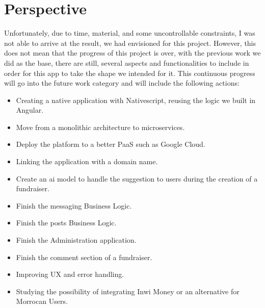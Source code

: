 \section*{Perspective}
Unfortunately, due to time, material, and some uncontrollable constraints, I was not able to arrive 
at the result, we had envisioned
for this project. However, this does not mean that the progress of this project is over, with the
previous work we did as the base, there are
still, several aspects and functionalities to include in order for this app to take the shape we
intended for it. This continuous progress will go into the future work category and will include
the following actions:
\begin{itemize}
    \item Creating a native application with Nativescript, reusing the logic we built in Angular.
    \item Move from a monolithic architecture to microservices.
    \item Deploy the platform to a better PaaS such as Google Cloud.
    \item Linking the application with a domain name.
    \item Create an ai model to handle the suggestion to users during the creation of a fundraiser.
    \item Finish the messaging Business Logic.
    \item Finish the posts Business Logic.
    \item Finish the Administration application.
    \item Finish the comment section of a fundraiser.
    \item Improving UX and error handling.
    \item Studying the possibility of integrating Inwi Money or an alternative for Morrocan Users.
\end{itemize}

